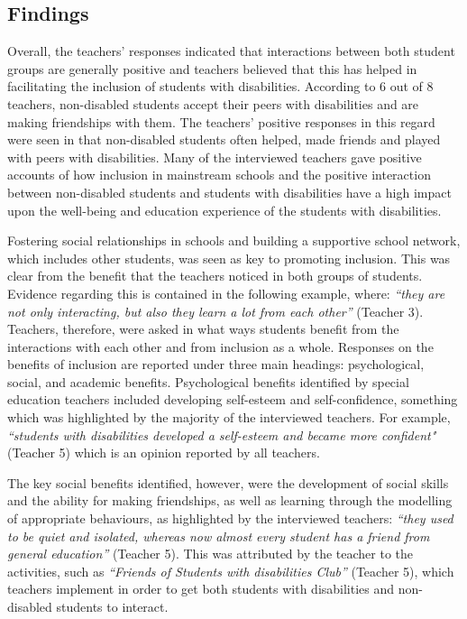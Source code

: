 \documentclass[11.5pt]{sig-alternate}
\begin{document}
\begin{large}
\section*{Findings}
Overall, the teachers’ responses indicated that interactions between both student groups are generally positive and teachers believed that this has helped in facilitating the inclusion of students with disabilities. According to 6 out of 8 teachers, non-disabled students accept their peers with disabilities and are making friendships with them. The teachers’ positive responses in this regard were seen in that non-disabled students often helped, made friends and played with peers with disabilities. Many of the interviewed teachers gave positive accounts of how inclusion in mainstream schools and the positive interaction between non-disabled students and students with disabilities have a high impact upon the well-being and education experience of the students with disabilities.

Fostering social relationships in schools and building a supportive school network, which includes other students, was seen as key to promoting inclusion. This was clear from the benefit that the teachers noticed in both groups of students. Evidence regarding this is contained in the following example, where: \textit{“they are not only interacting, but also they learn a lot from each other”} (Teacher 3). Teachers, therefore, were asked in what ways students benefit from the interactions with each other and from inclusion as a whole. Responses on the benefits of inclusion are reported under three main headings: psychological, social, and academic benefits. Psychological benefits identified by special education teachers included developing self-esteem and self-confidence, something which was highlighted by the majority of the interviewed teachers. For example, \textit{“students with disabilities developed a self-esteem and became more confident"} (Teacher 5) which is an opinion reported by all teachers.  
 
The key social benefits identified, however, were the development of social skills and the ability for making friendships, as well as learning through the modelling of appropriate behaviours, as highlighted by the interviewed teachers: \textit{“they used to be quiet and isolated, whereas now almost every student has a friend from general education”} (Teacher 5). This was attributed by the teacher to the activities, such as \textit{“Friends of Students with disabilities Club”} (Teacher 5), which teachers implement in order to get both students with disabilities and non-disabled students to interact. 


\end{large}
\end{document}
